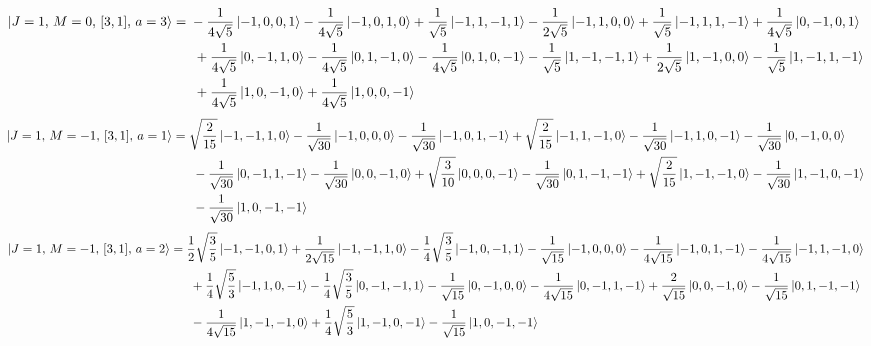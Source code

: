 \documentclass{article}
\begin{document}
{\small
\begin{equation*}
\begin{aligned}
\ket{J=1,\,M=0,\,[3,1],\,a=3} = \; &- \frac{1}{4\sqrt{5}} \ket{-1,0,0,1} - \frac{1}{4\sqrt{5}} \ket{-1,0,1,0} + \frac{1}{\sqrt{5}} \ket{-1,1,-1,1} - \frac{1}{2\sqrt{5}} \ket{-1,1,0,0} + \frac{1}{\sqrt{5}} \ket{-1,1,1,-1} + \frac{1}{4\sqrt{5}} \ket{0,-1,0,1} \\
  & \; + \frac{1}{4\sqrt{5}} \ket{0,-1,1,0} - \frac{1}{4\sqrt{5}} \ket{0,1,-1,0} - \frac{1}{4\sqrt{5}} \ket{0,1,0,-1} - \frac{1}{\sqrt{5}} \ket{1,-1,-1,1} + \frac{1}{2\sqrt{5}} \ket{1,-1,0,0} - \frac{1}{\sqrt{5}} \ket{1,-1,1,-1} \\
  & \; + \frac{1}{4\sqrt{5}} \ket{1,0,-1,0} + \frac{1}{4\sqrt{5}} \ket{1,0,0,-1}
\end{aligned}
\end{equation*}}
{\small
\begin{equation*}
\begin{aligned}
\ket{J=1,\,M=-1,\,[3,1],\,a=1} = \; &\sqrt{\frac{2}{15}} \ket{-1,-1,1,0} - \frac{1}{\sqrt{30}} \ket{-1,0,0,0} - \frac{1}{\sqrt{30}} \ket{-1,0,1,-1} + \sqrt{\frac{2}{15}} \ket{-1,1,-1,0} - \frac{1}{\sqrt{30}} \ket{-1,1,0,-1} - \frac{1}{\sqrt{30}} \ket{0,-1,0,0} \\
  & \; - \frac{1}{\sqrt{30}} \ket{0,-1,1,-1} - \frac{1}{\sqrt{30}} \ket{0,0,-1,0} + \sqrt{\frac{3}{10}} \ket{0,0,0,-1} - \frac{1}{\sqrt{30}} \ket{0,1,-1,-1} + \sqrt{\frac{2}{15}} \ket{1,-1,-1,0} - \frac{1}{\sqrt{30}} \ket{1,-1,0,-1} \\
  & \; - \frac{1}{\sqrt{30}} \ket{1,0,-1,-1}
\end{aligned}
\end{equation*}}
{\small
\begin{equation*}
\begin{aligned}
\ket{J=1,\,M=-1,\,[3,1],\,a=2} = \; &\frac{1}{2}\sqrt{\frac{3}{5}} \ket{-1,-1,0,1} + \frac{1}{2\sqrt{15}} \ket{-1,-1,1,0} - \frac{1}{4}\sqrt{\frac{3}{5}} \ket{-1,0,-1,1} - \frac{1}{\sqrt{15}} \ket{-1,0,0,0} - \frac{1}{4\sqrt{15}} \ket{-1,0,1,-1} - \frac{1}{4\sqrt{15}} \ket{-1,1,-1,0} \\
  & \; + \frac{1}{4}\sqrt{\frac{5}{3}} \ket{-1,1,0,-1} - \frac{1}{4}\sqrt{\frac{3}{5}} \ket{0,-1,-1,1} - \frac{1}{\sqrt{15}} \ket{0,-1,0,0} - \frac{1}{4\sqrt{15}} \ket{0,-1,1,-1} + \frac{2}{\sqrt{15}} \ket{0,0,-1,0} - \frac{1}{\sqrt{15}} \ket{0,1,-1,-1} \\
  & \; - \frac{1}{4\sqrt{15}} \ket{1,-1,-1,0} + \frac{1}{4}\sqrt{\frac{5}{3}} \ket{1,-1,0,-1} - \frac{1}{\sqrt{15}} \ket{1,0,-1,-1}
\end{aligned}
\end{equation*}}
\end{document}
